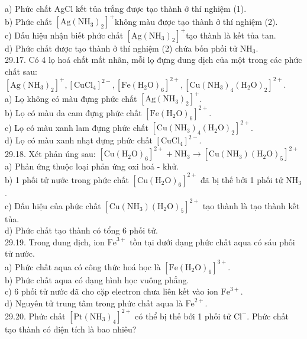 \documentclass[10pt]{article}
\begin{document}
a) Phức chất AgCl kết tủa trắng được tạo thành ở thí nghiệm (1).\\
b) Phức chất $\left[\mathrm{Ag}\left(\mathrm{NH}_{3}\right)_{2}\right]^{+}$không màu được tạo thành ở thí nghiệm (2).\\
c) Dấu hiệu nhận biết phức chất $\left[\mathrm{Ag}\left(\mathrm{NH}_{3}\right)_{2}\right]^{+}$tạo thành là kết tủa tan.\\
d) Phức chất được tạo thành ở thí nghiệm (2) chứa bốn phối tử $\mathrm{NH}_{3}$.\\
29.17. Có 4 lọ hoá chất mất nhãn, mỗi lọ đựng dung dịch của một trong các phức chất sau: $\left[\mathrm{Ag}\left(\mathrm{NH}_{3}\right)_{2}\right]^{+},\left[\mathrm{CuCl}_{4}\right]^{2-},\left[\mathrm{Fe}\left(\mathrm{H}_{2} \mathrm{O}\right)_{6}\right]^{2+},\left[\mathrm{Cu}\left(\mathrm{NH}_{3}\right)_{4}\left(\mathrm{H}_{2} \mathrm{O}\right)_{2}\right]^{2+}$.\\
a) Lọ không có màu đựng phức chất $\left[\mathrm{Ag}\left(\mathrm{NH}_{3}\right)_{2}\right]^{+}$.\\
b) Lọ có màu da cam đựng phức chất $\left[\mathrm{Fe}\left(\mathrm{H}_{2} \mathrm{O}\right)_{6}\right]^{2+}$.\\
c) Lọ có màu xanh lam đựng phức chất $\left[\mathrm{Cu}\left(\mathrm{NH}_{3}\right)_{4}\left(\mathrm{H}_{2} \mathrm{O}\right)_{2}\right]^{2+}$.\\
d) Lọ có màu xanh nhạt đựng phức chất $\left[\mathrm{CuCl}_{4}\right]^{2-}$.\\
29.18. Xét phản úng sau: $\left[\mathrm{Cu}\left(\mathrm{H}_{2} \mathrm{O}\right)_{6}\right]^{2+}+\mathrm{NH}_{3} \longrightarrow\left[\mathrm{Cu}\left(\mathrm{NH}_{3}\right)\left(\mathrm{H}_{2} \mathrm{O}\right)_{5}\right]^{2+}$\\
a) Phản ứng thuộc loại phản ứng oxi hoá - khử.\\
b) 1 phối tử nước trong phức chất $\left[\mathrm{Cu}\left(\mathrm{H}_{2} \mathrm{O}\right)_{6}\right]^{2+}$ đã bị thế bởi 1 phối tử $\mathrm{NH}_{3}$.\\
c) Dấu hiệu của phức chất $\left[\mathrm{Cu}\left(\mathrm{NH}_{3}\right)\left(\mathrm{H}_{2} \mathrm{O}\right)_{5}\right]^{2+}$ tạo thành là tạo thành kết tủa.\\
d) Phức chất tạo thành có tổng 6 phối tử.\\
29.19. Trong dung dịch, ion $\mathrm{Fe}^{3+}$ tồn tại dưới dạng phức chất aqua có sáu phối tử nước.\\
a) Phức chất aqua có công thức hoá học là $\left[\mathrm{Fe}\left(\mathrm{H}_{2} \mathrm{O}\right)_{6}\right]^{3+}$.\\
b) Phức chất aqua có dạng hình học vuông phẳng.\\
c) 6 phối tử nước đã cho cặp electron chưa liên kết vào ion $\mathrm{Fe}^{3+}$.\\
d) Nguyên tử trung tâm trong phức chất aqua là $\mathrm{Fe}^{2+}$.\\
29.20. Phức chất $\left[\mathrm{Pt}\left(\mathrm{NH}_{3}\right)_{4}\right]^{2+}$ có thể bị thế bởi 1 phối tử $\mathrm{Cl}^{-}$. Phức chất tạo thành có điện tích là bao nhiêu?
\end{document}
